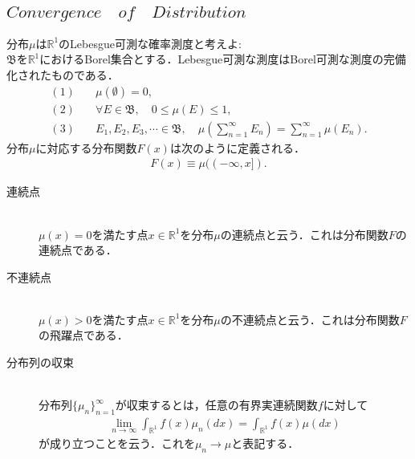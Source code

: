 \documentclass[a4j,papersize,disablejfam,slide,14pt]{jsarticle}
\begin{document}
\subsection{$Convergence\quad of\quad Distribution$}
	分布$\mu$は$\mathbb{R}^1$の{\rm Lebesgue}可測な確率測度と考えよ:\\
    $\mathfrak{B}$を$\mathbb{R}^1$における{\rm Borel}集合とする．{\rm Lebesgue}可測な測度は{\rm Borel}可測な測度の完備化されたものである．
    \begin{align}
    	(1) &\quad \mu(\emptyset) = 0,\\
        (2) &\quad \forall E \in \mathfrak{B}, \quad 0 \leq \mu(E) \leq 1,\\
        (3) &\quad E_1,E_2,E_3,\cdots \in \mathfrak{B},\quad \mu\left(\sum_{n=1}^{\infty} E_n\right) = \sum_{n=1}^{\infty} \mu(E_n).
    \end{align}
    分布$\mu$に対応する分布関数$F(x)$は次のように定義される．
    \begin{align}
    	F(x) \equiv \mu((-\infty, x]).
    \end{align}
    \begin{screen}
    	\begin{description}
        	\item[連続点]\mbox{}\\
        		$\mu({x}) = 0$を満たす点$x \in \mathbb{R}^1$を分布$\mu$の連続点と云う．これは分布関数$F$の連続点である．
            \item[不連続点]\mbox{}\\
            	$\mu({x}) > 0$を満たす点$x \in \mathbb{R}^1$を分布$\mu$の不連続点と云う．これは分布関数$F$の飛躍点である．
        \end{description}
    \end{screen}
    \begin{screen}
    	\begin{description}
        	\item[分布列の収束]\mbox{}\\
    			分布列$\{ \mu_n \}_{n=1}^{\infty}$が収束するとは，任意の有界実連続関数$f$に対して
    			\begin{align}
    				\lim_{n \to \infty} \int_{\mathbb{R}^1} f(x) \mu_n(dx) = \int_{\mathbb{R}^1} f(x) \mu(dx)
    			\end{align}
    			が成り立つことを云う．これを$\mu_n \to \mu$と表記する．
        \end{description}
    \end{screen}
    
\end{document}
